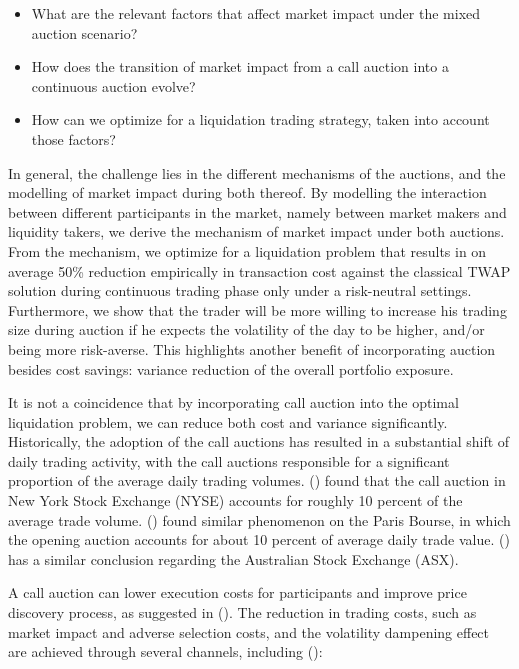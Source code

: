 \begin{itemize}
  \item What are the relevant factors that affect market impact under the mixed auction scenario?
  \item How does the transition of market impact from a call auction into a continuous auction evolve?
  \item How can we optimize for a liquidation trading strategy, taken into account those factors?
\end{itemize}

In general, the challenge lies in the different mechanisms of the auctions, and the modelling of market impact during both thereof. By modelling the interaction between different participants in the market, namely between market makers and liquidity takers, we derive the mechanism of market impact under both auctions. From the mechanism, we optimize for a liquidation problem that results in on average 50\% reduction empirically in transaction cost against the classical TWAP solution during continuous trading phase only under a risk-neutral settings. {\color{red}Furthermore, we show that the trader will be more willing to increase his trading size during auction if he expects the volatility of the day to be higher, and/or being more risk-averse. This highlights another benefit of incorporating auction besides cost savings: variance reduction of the overall portfolio exposure.}

It is not a coincidence that by incorporating call auction into the optimal liquidation problem, we can reduce both {\color{red}cost and variance} significantly. Historically, the adoption of the call auctions has resulted in a substantial shift of daily trading activity, with the call auctions responsible for a significant proportion of the average daily trading volumes. (\cite{Madhavan2015}) found that the call auction in New York Stock Exchange (NYSE) accounts for roughly 10 percent of the average trade volume. (\cite{Bruno1999}) found similar phenomenon on the Paris Bourse, in which the opening auction accounts for about 10 percent of average daily trade value. (\cite{Carole2006}) has a similar conclusion regarding the Australian Stock Exchange (ASX).

A call auction can lower execution costs for participants and improve price discovery process, as suggested in (\cite{Pagano2003}). The reduction in trading costs, such as market impact and adverse selection costs, {\color{red}and the volatility dampening effect are} achieved through several channels, including (\cite{Carole2006}):

